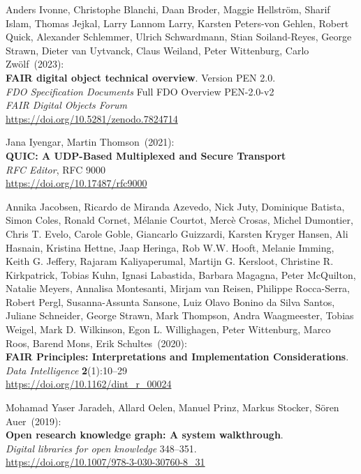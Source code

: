 \begin{thebibliography}{9}
Anders Ivonne, Christophe Blanchi, Daan Broder, Maggie Hellström, Sharif Islam, Thomas Jejkal, Larry Lannom Larry, Karsten Peters-von Gehlen, Robert Quick, Alexander Schlemmer, Ulrich Schwardmann, Stian Soiland-Reyes, George Strawn, Dieter van Uytvanck, Claus Weiland, Peter Wittenburg, Carlo Zwölf~(2023): \\
\textbf{{FAIR} digital object technical overview}. Version PEN 2.0.\\
\emph{FDO Specification Documents} Full FDO Overview PEN-2.0-v2 \\
\emph{FAIR Digital Objects Forum}\\
\url{https://doi.org/10.5281/zenodo.7824714}

Jana Iyengar, Martin Thomson~(2021): \\
\textbf{{QUIC}: {A UDP-Based Multiplexed} and {Secure Transport}}\\
\emph{RFC Editor}, RFC 9000\\
\url{https://doi.org/10.17487/rfc9000}

Annika Jacobsen, Ricardo de Miranda Azevedo, Nick Juty, Dominique Batista, Simon Coles, Ronald Cornet, Mélanie Courtot, Mercè Crosas, Michel Dumontier, Chris T. Evelo, Carole Goble, Giancarlo Guizzardi, Karsten Kryger Hansen, Ali Hasnain, Kristina Hettne, Jaap Heringa, Rob W.W. Hooft, Melanie Imming, Keith G. Jeffery, Rajaram Kaliyaperumal, Martijn G. Kersloot, Christine R. Kirkpatrick, Tobias Kuhn, Ignasi Labastida, Barbara Magagna, Peter McQuilton, Natalie Meyers, Annalisa Montesanti, Mirjam van Reisen, Philippe Rocca-Serra, Robert Pergl, Susanna-Assunta Sansone, Luiz Olavo Bonino da Silva Santos, Juliane Schneider, George Strawn, Mark Thompson, Andra Waagmeester, Tobias Weigel, Mark D. Wilkinson, Egon L. Willighagen, Peter Wittenburg, Marco Roos, Barend Mons, Erik Schultes~(2020): \\
\textbf{FAIR Principles: Interpretations and Implementation Considerations}.\\
\emph{Data Intelligence} \textbf{2}(1):10--29\\
\url{https://doi.org/10.1162/dint_r_00024}

Mohamad Yaser Jaradeh, Allard Oelen, Manuel Prinz, Markus Stocker, Sören Auer~(2019): \\
\textbf{Open research knowledge graph: A system walkthrough}. \\
\emph{Digital libraries for open knowledge} 348--351.\\
\url{https://doi.org/10.1007/978-3-030-30760-8_31}


\end{thebibliography}
